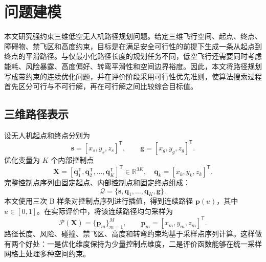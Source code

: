 ﻿\section{问题建模}

\label{sec:problem-formulation}

本文研究强约束三维低空无人机路径规划问题。给定三维飞行空间、起点、终点、障碍物、禁飞区和高度约束，目标是在满足安全可行性的前提下生成一条从起点到终点的平滑路径。与仅最小化路径长度的规划任务不同，低空飞行还需要同时考虑能耗、风险暴露、高度偏好、转弯平滑性和空间边界裕度。因此，本文将路径规划写成带约束的连续优化问题，并在评价阶段采用可行性优先准则，使算法搜索过程首先区分可行与不可行解，再在可行解之间比较综合目标值。

\subsection{三维路径表示}

设无人机起点和终点分别为
\begin{equation}
    \mathbf{s}=[x_s,y_s,z_s]^\mathsf{T}, \qquad
    \mathbf{g}=[x_g,y_g,z_g]^\mathsf{T}.
\end{equation}
优化变量为 $K$ 个内部控制点
\begin{equation}
    \mathbf{X} =
    [\mathbf{q}_1^\mathsf{T},\mathbf{q}_2^\mathsf{T},\ldots,\mathbf{q}_K^\mathsf{T}]^\mathsf{T}
    \in \mathbb{R}^{3K},
    \quad
    \mathbf{q}_k=[x_k,y_k,z_k]^\mathsf{T}.
    \label{eq:path-decision-vector}
\end{equation}
完整控制点序列由固定起点、内部控制点和固定终点组成：
\begin{equation}
    \mathcal{Q} = \{\mathbf{s}, \mathbf{q}_1,\ldots,\mathbf{q}_K,\mathbf{g}\}.
\end{equation}
本文使用三次 B 样条对控制点序列进行插值，得到连续路径 $\mathbf{p}(u)$，其中 $u\in[0,1]$。在实际评价中，将该连续路径均匀采样为
\begin{equation}
    \mathcal{P}(\mathbf{X})=\{\mathbf{p}_m\}_{m=1}^{M}, \qquad
    \mathbf{p}_m=[x_m,y_m,z_m]^\mathsf{T}.
    \label{eq:sampled-path}
\end{equation}
路径长度、风险、碰撞、禁飞区、高度和转弯约束均基于采样点序列计算。这样做有两个好处：一是优化维度保持为少量控制点维度，二是评价函数能够在统一采样网格上处理多种空间约束。

